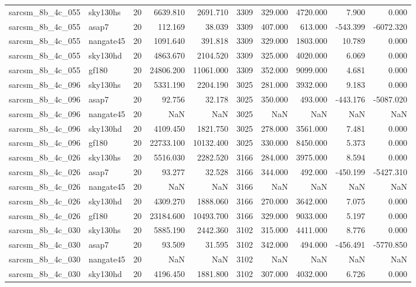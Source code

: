 \begin{longtable}{llrrrrrrrr}
sarcsm\_8b\_4c\_055 & sky130hs & 20 & 6639.810 & 2691.710 & 3309 & 329.000 & 4720.000 & 7.900 & 0.000 \\
sarcsm\_8b\_4c\_055 & asap7 & 20 & 112.169 & 38.039 & 3309 & 407.000 & 613.000 & -543.399 & -6072.320 \\
sarcsm\_8b\_4c\_055 & nangate45 & 20 & 1091.640 & 391.818 & 3309 & 329.000 & 1803.000 & 10.789 & 0.000 \\
sarcsm\_8b\_4c\_055 & sky130hd & 20 & 4863.670 & 2104.520 & 3309 & 325.000 & 4020.000 & 6.069 & 0.000 \\
sarcsm\_8b\_4c\_055 & gf180 & 20 & 24806.200 & 11061.000 & 3309 & 352.000 & 9099.000 & 4.681 & 0.000 \\
sarcsm\_8b\_4c\_096 & sky130hs & 20 & 5331.190 & 2204.190 & 3025 & 281.000 & 3932.000 & 9.183 & 0.000 \\
sarcsm\_8b\_4c\_096 & asap7 & 20 & 92.756 & 32.178 & 3025 & 350.000 & 493.000 & -443.176 & -5087.020 \\
sarcsm\_8b\_4c\_096 & nangate45 & 20 & NaN & NaN & 3025 & NaN & NaN & NaN & NaN \\
sarcsm\_8b\_4c\_096 & sky130hd & 20 & 4109.450 & 1821.750 & 3025 & 278.000 & 3561.000 & 7.481 & 0.000 \\
sarcsm\_8b\_4c\_096 & gf180 & 20 & 22733.100 & 10132.400 & 3025 & 330.000 & 8450.000 & 5.373 & 0.000 \\
sarcsm\_8b\_4c\_026 & sky130hs & 20 & 5516.030 & 2282.520 & 3166 & 284.000 & 3975.000 & 8.594 & 0.000 \\
sarcsm\_8b\_4c\_026 & asap7 & 20 & 93.277 & 32.528 & 3166 & 344.000 & 492.000 & -450.199 & -5427.310 \\
sarcsm\_8b\_4c\_026 & nangate45 & 20 & NaN & NaN & 3166 & NaN & NaN & NaN & NaN \\
sarcsm\_8b\_4c\_026 & sky130hd & 20 & 4309.270 & 1888.060 & 3166 & 270.000 & 3642.000 & 7.075 & 0.000 \\
sarcsm\_8b\_4c\_026 & gf180 & 20 & 23184.600 & 10493.700 & 3166 & 329.000 & 9033.000 & 5.197 & 0.000 \\
sarcsm\_8b\_4c\_030 & sky130hs & 20 & 5885.190 & 2442.360 & 3102 & 315.000 & 4411.000 & 8.776 & 0.000 \\
sarcsm\_8b\_4c\_030 & asap7 & 20 & 93.509 & 31.595 & 3102 & 342.000 & 494.000 & -456.491 & -5770.850 \\
sarcsm\_8b\_4c\_030 & nangate45 & 20 & NaN & NaN & 3102 & NaN & NaN & NaN & NaN \\
sarcsm\_8b\_4c\_030 & sky130hd & 20 & 4196.450 & 1881.800 & 3102 & 307.000 & 4032.000 & 6.726 & 0.000 \\

\end{longtable}
